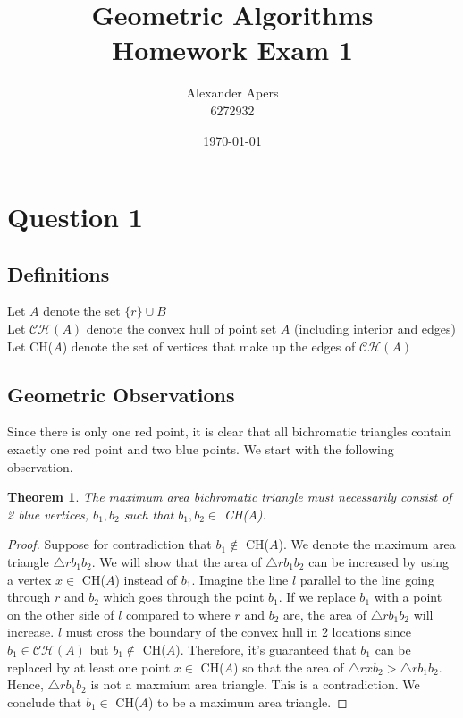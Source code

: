 \documentclass[a4paper]{article}
\title{\huge{Geometric Algorithms \\ Homework Exam 1}}
\author{Alexander Apers \\ 6272932}
\affil{\small{Utrecht University\\ \href{a.p.apers@uu.nl}{a.p.apers@uu.nl}}}
\date{\today}
\newtheorem{theorem}{Theorem}
\newcommand{\CH}{\mathcal{C}\mathcal{H}}
\begin{document}
    \maketitle

    \section*{Question 1}
    \subsection*{Definitions}
    Let $A$ denote the set $\{r\} \cup B$ \\
    Let $\CH(A)$ denote the convex hull of point set $A$ (including interior and edges) \\
    Let CH($A$) denote the set of vertices that make up the edges of $\CH(A)$

    \subsection*{Geometric Observations}
    Since there is only one red point, it is clear that all bichromatic triangles contain exactly one red point and two blue points.
    We start with the following observation. \\

    \begin{theorem}
    The maximum area bichromatic triangle must necessarily consist of 2 blue vertices, $b_1, b_2$ such that $b_1, b_2 \in$ CH($A$).
    \end{theorem}

    \begin{proof}
        Suppose for contradiction that $b_1 \notin$ CH($A$). We denote the maximum area triangle $\triangle rb_1b_2$.
        We will show that the area of $\triangle rb_1b_2$ can be increased by using a vertex $x \in$ CH($A$) instead of $b_1$.
        Imagine the line $l$ parallel to the line going through $r$ and $b_{2}$ which goes through the point $b_{1}$.
        If we replace $b_{1}$ with a point on the other side of $l$ compared to where $r$ and $b_{2}$ are, the area of $\triangle rb_1b_2$ will increase.
        $l$ must cross the boundary of the convex hull in 2 locations since $b_1 \in \CH(A)$ but $b_1 \notin$ CH($A$).
        Therefore, it's guaranteed that $b_{1}$ can be replaced by at least one point $x \in$ CH($A$) so that the area of $\triangle rxb_2 > \triangle rb_1b_2$.
        Hence, $\triangle rb_{1}b_{2}$ is not a maxmium area triangle. This is a contradiction. 
        We conclude that $b_1 \in$ CH($A$) to be a maximum area triangle. 
    \end{proof}
\end{document}
